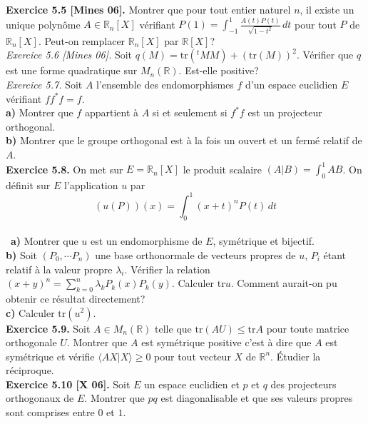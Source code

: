 \documentclass[a4paper,12pt,francais]{article}
\newcommand{\field}[1]{\mathbb{#1}}
\newcommand{\R}{\field{R}}
\newcommand{\tr}{\mbox{tr}}
\begin{document}
\noindent
{\bf Exercice 5.5 [Mines 06].} Montrer que pour tout entier naturel $n$, il existe un unique polynôme $A\in\R_n[X]$ vérifiant $P(1)=\int_{-1}^1 \frac{A(t)P(t)}{\sqrt{1-t^2}} \, dt$ pour tout $P$ de $\R_n[X]$. Peut-on remplacer $\R_n[X]$ par $\R[X]$?\\

\noindent
{\it Exercice 5.6  [Mines 06].} Soit $q(M)=\tr(^tMM)+(\tr(M))^2$. Vérifier que $q$ est une forme quadratique sur $M_n(\R)$. Est-elle positive?\\

\noindent
{\it Exercice 5.7.} Soit $A$ l'ensemble des endomorphismes $f$ d'un espace euclidien $E$ vérifiant $ff^*f=f$.\\
\indent
{\bf a)} Montrer que $f$ appartient à $A$ si et seulement si $f^*f$ est un projecteur orthogonal.\\
\indent
{\bf b)} Montrer que le groupe orthogonal est à la fois un ouvert et un fermé relatif de $A$.\\

\noindent
{\bf Exercice 5.8.} On met sur $E=\R_n[X]$  le produit scalaire $(A|B)=\int_0^1 AB$. On définit sur $E$ l'application $u$ par 
$$(u(P))(x)= \int_0^1(x+t)^n P(t)\, dt$$\\\
{\bf a)} Montrer que $u$ est un endomorphisme de $E$, symétrique et bijectif.\\
{\bf b)} Soit $(P_0,\cdots P_n)$ une base orthonormale de vecteurs propres de $u$, $P_i$ étant relatif à la valeur propre $\lambda_i$. Vérifier la relation
$\displaystyle (x+y)^n=\sum_{k=0}^n \lambda_k P_k(x) P_k(y).$ Calculer $\tr u$. Comment aurait-on pu obtenir ce résultat directement?\\
{\bf c)}  Calculer $\tr(u^2)$.\\

\noindent
{\bf Exercice 5.9.} Soit $A \in M_n(\R)$ telle que $\tr (AU) \leqslant \tr A$ pour toute matrice orthogonale $U$. Montrer que $A$ est symétrique positive c'est à dire que $A$ est symétrique et vérifie $\langle AX|X \rangle \geqslant 0$ pour tout vecteur $X$ de $\R^n$. \'Etudier la réciproque.\\

\noindent
{\bf Exercice 5.10 [X 06].} Soit $E$ un espace euclidien et $p$ et $q$ des projecteurs orthogonaux de $E$. Montrer que $pq$ est diagonalisable et que ses valeurs propres sont comprises entre $0$ et $1$.\\
\end{document}
